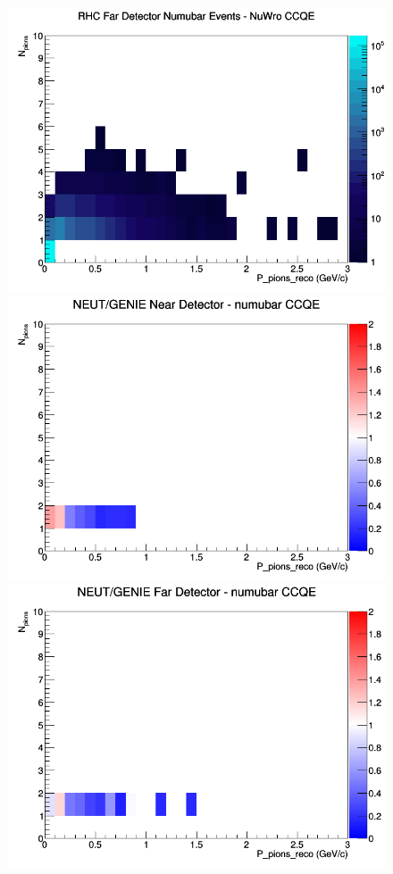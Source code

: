 \documentclass[12pt]{article}
\begin{document}
\begin{figure}[h]
\endminipage
{}
\includegraphics[width=\linewidth]{eff_N_P/FGT/pions/CCQE_RHC_FD_numubar_N_P_NuWro.png}
\endminipage
\newline
{}
\includegraphics[width=\linewidth]{eff_N_P/FGT/pions/ratios/CCQE_NEUT_GENIE_numubar_near_N_P.png}
\endminipage
{}
\includegraphics[width=\linewidth]{eff_N_P/FGT/pions/ratios/CCQE_NEUT_GENIE_numubar_far_N_P.png}

\end{figure}
\end{document}
